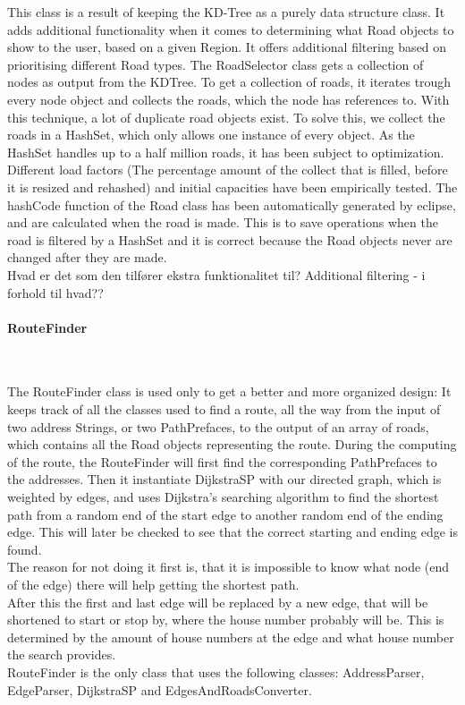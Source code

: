 \documentclass[a4paper,10pt,titlepage]{article}
\begin{document}
This class is a result of keeping the KD-Tree as a purely data structure class. It adds additional functionality when it comes to determining what Road objects to show to the user, based on a given Region. It offers additional filtering based on prioritising different Road types.
The RoadSelector class gets a collection of nodes as output from the KDTree. To get a collection of roads, it iterates trough every node object and collects the roads, which the node has references to. With this technique, a lot of duplicate road objects exist. To solve this, we collect the roads in a HashSet, which only allows one instance of every object. As the HashSet handles up to a half million roads, it has been subject to optimization. Different load factors (The percentage amount of the collect that is filled, before it is resized and rehashed) and initial capacities have been empirically tested.
The hashCode function of the Road class has been automatically generated by eclipse, and are calculated when the road is made. This is to save operations when the road is filtered by a HashSet and it is correct because the Road objects never are changed after they are made.
\\ Hvad er det som den tilfører ekstra funktionalitet til? 
Additional filtering - i forhold til hvad??
				
				\paragraph{RouteFinder}\mbox{}\
				
The RouteFinder class is used only to get a better and more organized design: It keeps track of all the classes used to find a route, 	all the way from the input of two address Strings, or two PathPrefaces, to the output of an array of roads, which contains all the Road objects representing the route. During the computing of the route, the RouteFinder will first find the corresponding PathPrefaces to the addresses. Then it instantiate DijkstraSP with our directed graph, which is weighted by edges,  and uses Dijkstra’s searching algorithm to find the shortest path from a random end of the start edge to another random end of the ending edge. This will later be checked to see that the correct starting and ending edge is found.\\
The reason for not doing it first is, that it is impossible to know what node (end of the edge) there will help getting the shortest path.\\
After this the first and last edge will be replaced by a new edge, that will be shortened to start or stop by, where the house number probably will be. This is determined by the amount of house numbers at the edge and what house number the search provides.\\
RouteFinder is the only class that uses the following classes: AddressParser,  EdgeParser, DijkstraSP and EdgesAndRoadsConverter.\\
\end{document}
